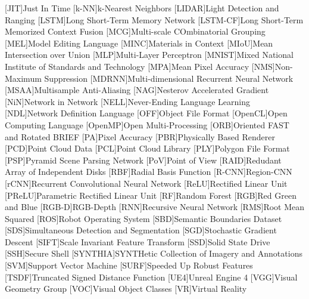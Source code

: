 \begin{acronym}
    [JIT]{Just In Time}
    [k-NN]{k-Nearest Neighbors}
    [LIDAR]{Light Detection and Ranging}
    [LSTM]{Long Short-Term Memory Network}
    [LSTM-CF]{Long Short-Term Memorized Context Fusion}
    [MCG]{Multi-scale COmbinatorial Grouping}
    [MEL]{Model Editing Language}
    [MINC]{Materials in Context}
    [MIoU]{Mean Intersection over Union}
	[MLP]{Multi-Layer Perceptron}
    [MNIST]{Mixed National Institute of Standards and Technology}
    [MPA]{Mean Pixel Accuracy}
    [NMS]{Non-Maximum Suppression}
    [MDRNN]{Multi-dimensional Recurrent Neural Network}
    [MSAA]{Multisample Anti-Aliasing}
    [NAG]{Nesterov Accelerated Gradient}
    [NiN]{Network in Network}
    [NELL]{Never-Ending Language Learning}
	[NDL]{Network Definition Language}
	[OFF]{Object File Format}
	[OpenCL]{Open Computing Language}
	[OpenMP]{Open Multi-Processing}
    [ORB]{Oriented FAST and Rotated BRIEF}
    [PA]{Pixel Accuracy}
    [PBR]{Physically Based Renderer}
	[PCD]{Point Cloud Data}
    [PCL]{Point Cloud Library}
    [PLY]{Polygon File Format}
    [PSP]{Pyramid Scene Parsing Network}
	[PoV]{Point of View}
	[RAID]{Redudant Array of Independent Disks}
    [RBF]{Radial Basis Function}
    [R-CNN]{Region-CNN}
    [rCNN]{Recurrent Convolutional Neural Network}
	[ReLU]{Rectified Linear Unit}
    [PReLU]{Parametric Rectified Linear Unit}
    [RF]{Random Forest}
	[RGB]{Red Green and Blue}
    [RGB-D]{RGB-Depth}
	[RNN]{Recursive Neural Network}
    [RMS]{Root Mean Squared}
    [ROS]{Robot Operating System}
    [SBD]{Semantic Boundaries Dataset}
    [SDS]{Simultaneous Detection and Segmentation}
	[SGD]{Stochastic Gradient Descent}
	[SIFT]{Scale Invariant Feature Transform}
	[SSD]{Solid State Drive}
    [SSH]{Secure Shell}
    [SYNTHIA]{SYNTHetic Collection of Imagery and Annotations}
    [SVM]{Support Vector Machine}
	[SURF]{Speeded Up Robust Features}
    [TSDF]{Truncated Signed Distance Function}
    [UE4]{Unreal Engine 4}
    [VGG]{Visual Geometry Group}
    [VOC]{Visual Object Classes}
    [VR]{Virtual Reality}
\end{acronym}
